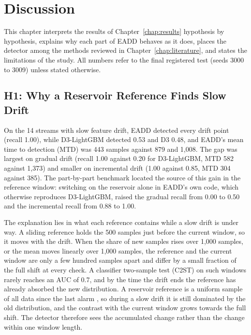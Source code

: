 \chapter{Discussion} \label{chap:discussion}

This chapter interprets the results of Chapter~\ref{chap:results} hypothesis by hypothesis, explains why each part of EADD behaves as it does, places the detector among the methods reviewed in Chapter~\ref{chap:literature}, and states the limitations of the study. All numbers refer to the final registered test (seeds 3000 to 3009) unless stated otherwise.

\section{H1: Why a Reservoir Reference Finds Slow Drift}
\label{sec:disc-h1}

On the 14 streams with slow feature drift, EADD detected every drift point (recall 1.00), while D3-LightGBM detected 0.53 and D3 0.48, and EADD's mean time to detection (MTD) was 443 samples against 879 and 1,008. The gap was largest on gradual drift (recall 1.00 against 0.20 for D3-LightGBM, MTD 582 against 1,373) and smaller on incremental drift (1.00 against 0.85, MTD 304 against 385). The part-by-part benchmark located the source of this gain in the reference window: switching on the reservoir alone in EADD's own code, which otherwise reproduces D3-LightGBM, raised the gradual recall from 0.00 to 0.50 and the incremental recall from 0.88 to 1.00.

The explanation lies in what each reference contains while a slow drift is under way. A sliding reference holds the 500 samples just before the current window, so it moves with the drift. When the share of new samples rises over 1,000 samples, or the mean moves linearly over 1,000 samples, the reference and the current window are only a few hundred samples apart and differ by a small fraction of the full shift at every check. A classifier two-sample test (C2ST) \citep{LopezPazOquab2017} on such windows rarely reaches an AUC of 0.7, and by the time the drift ends the reference has already absorbed the new distribution. A reservoir reference is a uniform sample of all data since the last alarm \citep{Vitter1985}, so during a slow drift it is still dominated by the old distribution, and the contrast with the current window grows towards the full shift. The detector therefore sees the accumulated change rather than the change within one window length.

